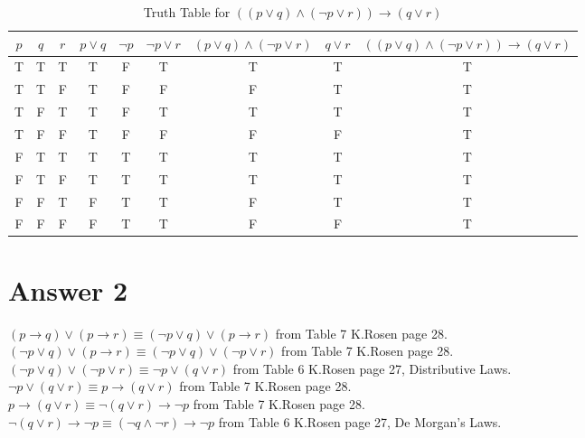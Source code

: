\documentclass[12pt]{article}
\begin{document}
\begin{table}[H]

\small
\centering
\caption{ Truth Table for  $((p \vee q) \wedge (\neg p \vee r)) \rightarrow (q \vee r) $ }
\label{table:question 1/a}
\begin{tabular}{|c c c|c|c|c|c|c|c|}	%
\hline 							%
\textbf{$p$} & \textbf{$q$} & \textbf{$r$} & \textbf{$p \vee q$} & \textbf{$\neg p $} & \textbf{$\neg p \vee r$} & \textbf{$(p \vee q) \wedge (\neg p \vee r) $} & \textbf{$ q \vee r $} &\textbf{$((p \vee q) \wedge (\neg p \vee r)) \rightarrow (q \vee r)$} \\
\hline 
\hline 
T & T & T & T & F & T & T & T & T\\			%
T & T & F & T & F & F & F & T & T\\
T & F & T & T & F & T & T & T & T\\
T & F & F & T & F & F & F & F & T\\
F & T & T & T & T & T & T & T & T\\
F & T & F & T & T & T & T & T & T\\
F & F & T & F & T & T & F & T & T\\
F & F & F & F & T & T & F & F & T\\
\hline 

\end{tabular}

\end{table}



\section*{Answer 2}

$(p \rightarrow q) \vee (p \rightarrow r) \equiv (\neg p \vee q) \vee (p \rightarrow r)$ from Table 7 K.Rosen page 28.\\
$(\neg p \vee q) \vee (p \rightarrow r) \equiv (\neg p \vee q) \vee (\neg p \vee r)$ from Table 7 K.Rosen page 28.\\
$(\neg p \vee q) \vee (\neg p \vee r) \equiv \neg p \vee (q \vee r)$ from Table 6 K.Rosen page 27, Distributive Laws.\\
$\neg p \vee (q \vee r) \equiv p \rightarrow (q \vee r)$ from Table 7 K.Rosen page 28.\\
$p \rightarrow (q \vee r) \equiv \neg (q \vee r) \rightarrow \neg p$ from Table 7 K.Rosen page 28.\\
$\neg (q \vee r) \rightarrow \neg p \equiv (\neg q \wedge \neg r) \rightarrow \neg p$ from Table 6 K.Rosen page 27, De Morgan's Laws.
\end{document}
